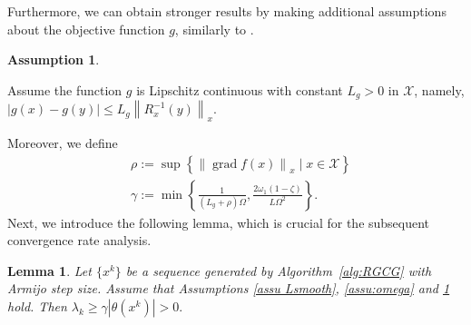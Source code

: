 \documentclass[pdflatex,sn-mathphys-num]{sn-jnl}%
\newtheorem{lemma}[theorem]{Lemma} %
\theoremstyle{definition} %
\newtheorem{assumption}{Assumption} %
\theoremstyle{remark} %
\begin{document}
    Furthermore, we can obtain stronger results by making additional assumptions about the objective function $g$, similarly to \cite[Section 3 (A4)]{assunccao2023generalized}.
    \begin{assumption}\label{assu:Lg}
    \begin{sloppypar}
    Assume the function $g$ is Lipschitz continuous with constant $L_g>0$ in $\mathcal{X}$, namely, $|g(x) - g(y)| \leq L_g \left\|{R}_x^{-1}(y)\right\|_x$. 
    \end{sloppypar}
    \end{assumption}

    Moreover, we define
    \begin{equation}\label{rho gamma}
    \begin{aligned}
    & \rho:= \sup \left\{\left\|\operatorname{grad} f(x)\right\|_x \mid x \in \mathcal{X} \right\} \\
    & \gamma:=\min \left\{\frac{1}{(L_g+\rho) \Omega}, \frac{2 \omega_1(1-\zeta)}{L \Omega^2}\right\} .
    \end{aligned}
    \end{equation}
Next, we introduce the following lemma, which is crucial for the subsequent convergence rate analysis.
    \begin{lemma}\label{lemma:lambda}
        Let $\{x^k\}$ be a sequence generated by Algorithm~\ref{alg:RGCG} with Armijo step size. Assume that  Assumptions \ref{assu Lsmooth}, \ref{assu:omega} and \ref{assu:Lg} hold. Then $\lambda_k\geq \gamma \left|\theta\left(x^k\right)\right| > 0.$
    \end{lemma}
\end{document}
